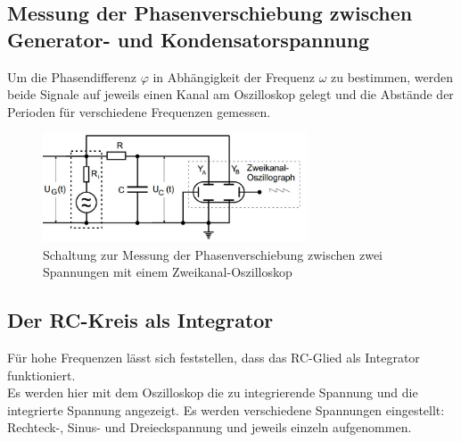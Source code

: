 \subsection{Messung der Phasenverschiebung zwischen Generator- und Kondensatorspannung}

Um die Phasendifferenz $\varphi$ in Abhängigkeit der Frequenz $\omega$
zu bestimmen, werden beide Signale auf jeweils einen Kanal am Oszilloskop gelegt und die Abstände der Perioden für verschiedene Frequenzen gemessen.
\begin{figure}[h]
  \centering
  \includegraphics[width=0.7\textwidth]{Grafiken/V353_Abb3.jpg}
  \caption{Schaltung zur Messung der Phasenverschiebung zwischen zwei Spannungen mit einem Zweikanal-Oszilloskop}
  \label{fig:V353_Abb3}
\end{figure}
\subsection{Der RC-Kreis als Integrator}
Für hohe Frequenzen lässt sich feststellen, dass das RC-Glied als Integrator funktioniert.\\
Es werden hier mit dem Oszilloskop die zu integrierende Spannung und die integrierte Spannung angezeigt. Es werden verschiedene Spannungen
eingestellt: Rechteck-, Sinus- und Dreieckspannung und jeweils einzeln aufgenommen.
